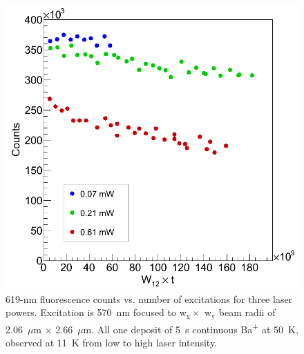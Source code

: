 
\begin{figure} %
        \centering
                \includegraphics[width=.5\textwidth]{figures/619_bleach_w12t.png}
                \caption{619-nm fluorescence counts vs. number of excitations for three laser powers.  Excitation is 570~nm focused to w$_{\text{x}} \times$ w$_{\text{y}}$ beam radii of 2.06~$\mu$m $\times$ 2.66~$\mu$m. All one deposit of 5~s continuous Ba\textsuperscript{+} at 50~K, observed at 11~K from low to high laser intensity.}
\label{fig:bleaching619}
\end{figure}




